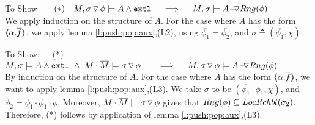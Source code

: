 \vspace{1cm}

$~$ \\
To Show \ \ \  $(*)\ \ \  M,  \PushSLong {\phi} {\sigma}   \models  A  \wedge \extThis    \ \  \ \  \Longrightarrow  \ \ \ \ M, \sigma \models \PushASLong  {Rng(\phi)} {A}$ 
\\
$~$ \\
We apply induction on the structure of $A$. For the case where $A$ has the form $\inside {\alpha.\overline f}$, we apply lemma \ref{l:push:pop:aux},(L2), using    $\overline {\phi_1} = \overline { \phi_2}$, and $\sigma \triangleq (\overline {\phi_1},\chi).$

\completeProofSub

\vspace{1cm}
$~$ \\
To Show:\ \ \   (*) \ \  $M, \sigma  \models  A  \wedge \extThis  \ \wedge \ M\cdot\Mtwo \models \PushSLong {\phi} {\sigma}   \ \  \ \ \  \  \Longrightarrow  \ \ \ \ M, \PushSLong {\phi} {\sigma} \models \PushASLong  {Rng(\phi)} {A}$
\\ 
$~$ \\
By induction on the structure of $A$. 
 For the case where $A$ has the form $\inside {\alpha.\overline f}$, we want to apply lemma \ref{l:push:pop:aux},(L3). We take  $\sigma$ to be $ (\overline {\phi_1}\cdot\phi_1, \chi)$, and $\overline {\phi_2}=\overline {\phi_1}\cdot\phi_1\cdot \phi$. Moreover,  $M\cdot\Mtwo \models \PushSLong {\phi} {\sigma}$ gives  that $Rng(\phi)\subseteq \LRelevantO {\sigma_2}$. Therefore, (*) follows by application of lemma \ref{l:push:pop:aux},(L3).\\
\completeProofSub